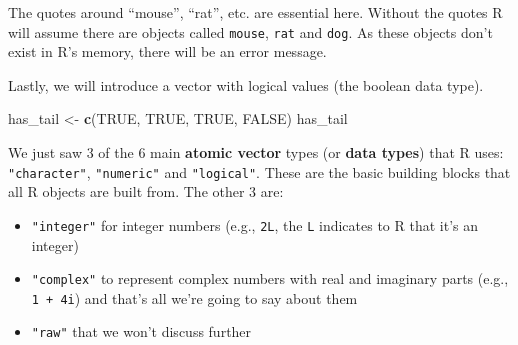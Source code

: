 \documentclass[]{book}
\newenvironment{Shaded}{\begin{snugshade}}{\end{snugshade}}
\newcommand{\KeywordTok}[1]{\textcolor[rgb]{0.13,0.29,0.53}{\textbf{#1}}}
\newcommand{\StringTok}[1]{\textcolor[rgb]{0.31,0.60,0.02}{#1}}
\newcommand{\OtherTok}[1]{\textcolor[rgb]{0.56,0.35,0.01}{#1}}
\newcommand{\NormalTok}[1]{#1}
\providecommand{\tightlist}{%
  \setlength{\itemsep}{0pt}\setlength{\parskip}{0pt}}
\begin{document}
The quotes around ``mouse'', ``rat'', etc. are essential here. Without
the quotes R will assume there are objects called \texttt{mouse},
\texttt{rat} and \texttt{dog}. As these objects don't exist in R's
memory, there will be an error message.

Lastly, we will introduce a vector with logical values (the boolean data
type).

\begin{Shaded}
\begin{Highlighting}[]
\NormalTok{has_tail <-}\StringTok{ }\KeywordTok{c}\NormalTok{(}\OtherTok{TRUE}\NormalTok{, }\OtherTok{TRUE}\NormalTok{, }\OtherTok{TRUE}\NormalTok{, }\OtherTok{FALSE}\NormalTok{)}
\NormalTok{has_tail }
\end{Highlighting}
\end{Shaded}

We just saw 3 of the 6 main \textbf{atomic vector} types (or
\textbf{data types}) that R uses: \texttt{"character"},
\texttt{"numeric"} and \texttt{"logical"}. These are the basic building
blocks that all R objects are built from. The other 3 are:

\begin{itemize}
\tightlist
\item
  \texttt{"integer"} for integer numbers (e.g., \texttt{2L}, the
  \texttt{L} indicates to R that it's an integer)
\item
  \texttt{"complex"} to represent complex numbers with real and
  imaginary parts (e.g., \texttt{1\ +\ 4i}) and that's all we're going
  to say about them
\item
  \texttt{"raw"} that we won't discuss further
\end{itemize}
\end{document}
